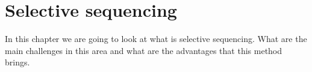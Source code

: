 \chapter{Selective sequencing}

\label{kap:selSeq} %

In this chapter we are going to look at what is selective sequencing. What are the
main challenges in this area and what are the advantages that this method brings.
